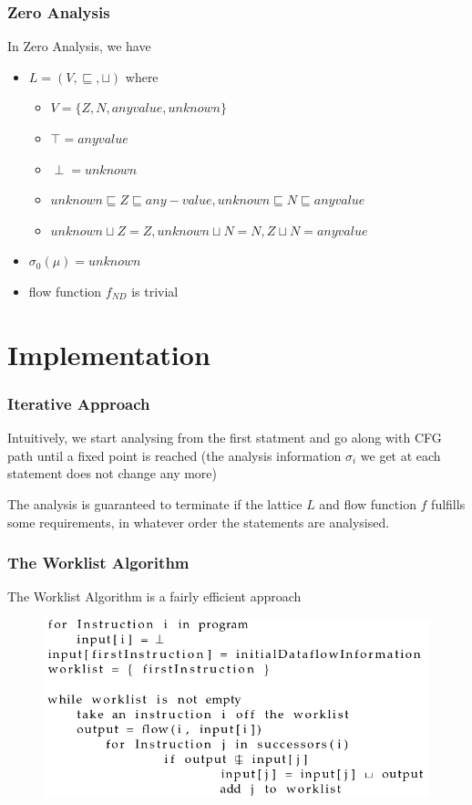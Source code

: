 \documentclass[]{beamer}
\begin{document}
\begin{frame}
  \frametitle{Zero Analysis}
  In Zero Analysis, we have
  \begin{itemize}
    \item $L=(V, \sqsubseteq, \sqcup)$ where
      \begin{itemize}
      \item $V=\{Z, N, anyvalue, unknown\}$
      \item $\top = anyvalue$
      \item $\perp = unknown$
      \item $unknown \sqsubseteq Z \sqsubseteq any-value, unknown \sqsubseteq N \sqsubseteq anyvalue$
      \item $unknown \sqcup Z = Z, unknown \sqcup N = N, Z \sqcup N = anyvalue$
      \end{itemize}
    \item $\sigma_0(\mu) = unknown$
    \item flow function $f_{ND}$ is trivial
  \end{itemize}
\end{frame}

\section{Implementation}
\frame{\tableofcontents[currentsection]}

\begin{frame}
  \frametitle{Iterative Approach}
  Intuitively, we start analysing from the first statment and go along with CFG path until
  a \alert{fixed point} is reached (the analysis
  information $\sigma_i$ we get at each statement does not change any more)

  \vspace{1em}\pause
  The analysis is guaranteed to terminate if the lattice $L$ and flow function $f$ fulfills
  some requirements, in whatever order the statements are analysised.
\end{frame}

\begin{frame}
  \frametitle{The Worklist Algorithm}
  The Worklist Algorithm is a fairly efficient approach
  \begin{figure}
    \includegraphics[width=.65\textwidth]{figures/worklist}
  \end{figure}
\end{frame}
\end{document}
